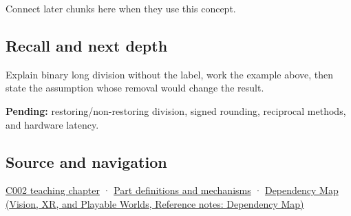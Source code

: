 \hypertarget{appendix-89985e6a2685-used-by}{}

Connect later chunks here when they use this concept.

\subsection{Recall and next depth}\label{appendix-89985e6a2685-recall-and-next-depth}

\hypertarget{appendix-89985e6a2685-recall-and-next-depth}{}

Explain binary long division without the label, work the example above, then state the assumption whose removal would change the result.

\textbf{Pending:} restoring/non-restoring division, signed rounding, reciprocal methods, and hardware latency.

\subsection{Source and navigation}\label{appendix-89985e6a2685-source-and-navigation}

\hypertarget{appendix-89985e6a2685-source-and-navigation}{}

\hyperref[01-foundations-i-ch001-arithmetic-becomes-a-policy]{C002 teaching chapter} · \hyperref[appendix-fd090d982a15]{Part definitions and mechanisms} · \href{../07-Vision-XR-and-Playable-Worlds/main.pdf\#nameddest=appendix-4ad47bdd269a}{Dependency Map (Vision, XR, and Playable Worlds, Reference notes: Dependency Map)}
